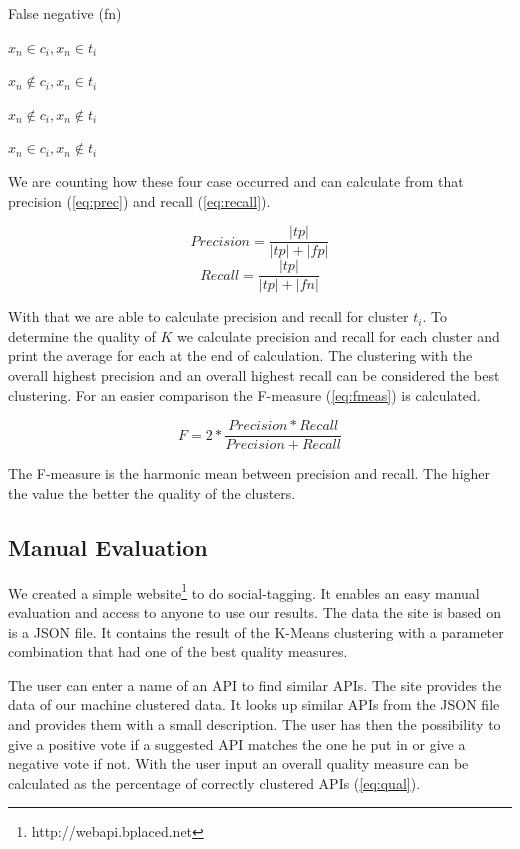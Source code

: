 \documentclass[a4paper]{IEEEtran}
\begin{document}
\begin{labeling}{False negative (fn)}
\centering \item  [True positive (tp)] $x_n \in c_i,x_n \in t_i$
\item [False positive (fp)] $x_n \notin c_i,x_n \in t_i$
\item [True negative (tn)] $x_n \notin c_i,x_n \notin t_i$
\item [False negative (fn)] $x_n \in c_i,x_n \notin t_i$
\end{labeling}

\vspace{2mm}
We are counting how these four case occurred and can calculate from that precision (\ref{eq:prec}) and recall (\ref{eq:recall}). 

\begin{equation}
\label{eq:prec}
Precision= \frac{|tp|}{|tp|+|fp|}
\end{equation}
\begin{equation}
\label{eq:recall}
Recall= \frac{|tp|}{|tp|+|fn|}
\end{equation}

With that we are able to calculate precision and recall for cluster $t_i$. To determine the quality of $K$ we calculate precision and recall for each cluster and print the average for each at the end of calculation. The clustering with the overall highest precision and an overall highest recall can be considered the best clustering. For an easier comparison the F-measure (\ref{eq:fmeas}) is calculated. 

\begin{equation}
\label{eq:fmeas}
F=2* \frac{Precision*Recall}{Precision+Recall}
\end{equation}

The F-measure is the harmonic mean between precision and recall. The higher the value the better the quality of the clusters.

\subsection{Manual Evaluation}
We created a simple website\footnote{http://webapi.bplaced.net} to do social-tagging. It enables an easy manual evaluation and access to anyone to use our results. The data the site is based on is a JSON file. It contains the result of the K-Means clustering with a parameter combination that had one of the best quality measures.

The user can enter a name of an API to find similar APIs. The site provides the data of our machine clustered data. It looks up similar APIs from the JSON file and provides them with a small description. The user has then the possibility to give a positive vote if a suggested API matches the one he put in or give a negative vote if not.
With the user input an overall quality measure can be calculated as the percentage of correctly clustered APIs (\ref{eq:qual}).
\end{document}
